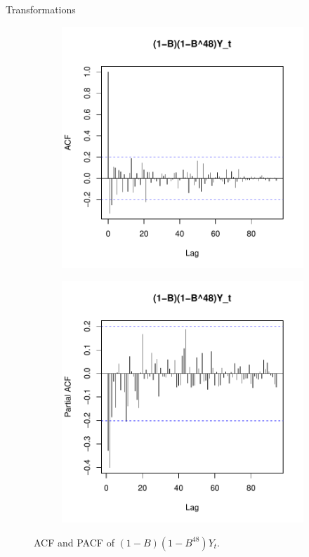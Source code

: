 \begin{subsection}{Transformations}
  \begin{figure}[!h]
    \begin{subfigure}[b]{.48\textwidth}
      \centering
      \includegraphics[scale=0.5]{../analysis/plots/trend_acf}
    \end{subfigure}
    \begin{subfigure}[b]{.48\textwidth}
      \centering
      \includegraphics[scale=0.5]{../analysis/plots/trend_pacf}
    \end{subfigure}
    \caption{ACF and PACF of $(1-B)\left(1 - B^{48}\right)Y_t$.}\label{cf_trend}
  \end{figure}


\end{subsection}

